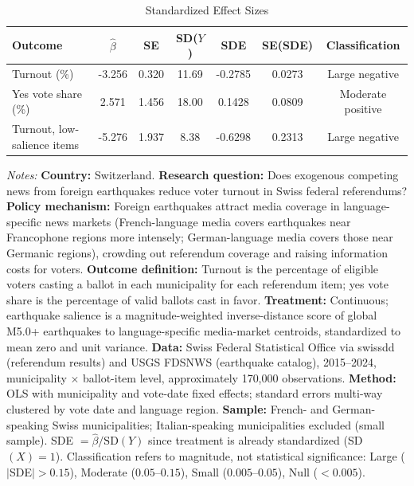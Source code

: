 \begin{table}[htbp]
\centering
\caption{Standardized Effect Sizes}
\label{tab:sde}
\begin{threeparttable}
\footnotesize
\begin{tabular}{lcccccc}
\toprule
Outcome & $\hat{\beta}$ & SE & SD($Y$) & SDE & SE(SDE) & Classification \\
\midrule
Turnout (\%) & -3.256 & 0.320 & 11.69 & -0.2785 & 0.0273 & Large negative \\
Yes vote share (\%) & 2.571 & 1.456 & 18.00 & 0.1428 & 0.0809 & Moderate positive \\
Turnout, low-salience items & -5.276 & 1.937 & 8.38 & -0.6298 & 0.2313 & Large negative \\
\bottomrule
\end{tabular}
\begin{tablenotes}[flushleft]
\footnotesize
\item \textit{Notes:} \textbf{Country:} Switzerland. \textbf{Research question:} Does exogenous competing news from foreign earthquakes reduce voter turnout in Swiss federal referendums? \textbf{Policy mechanism:} Foreign earthquakes attract media coverage in language-specific news markets (French-language media covers earthquakes near Francophone regions more intensely; German-language media covers those near Germanic regions), crowding out referendum coverage and raising information costs for voters. \textbf{Outcome definition:} Turnout is the percentage of eligible voters casting a ballot in each municipality for each referendum item; yes vote share is the percentage of valid ballots cast in favor. \textbf{Treatment:} Continuous; earthquake salience is a magnitude-weighted inverse-distance score of global M5.0+ earthquakes to language-specific media-market centroids, standardized to mean zero and unit variance. \textbf{Data:} Swiss Federal Statistical Office via swissdd (referendum results) and USGS FDSNWS (earthquake catalog), 2015--2024, municipality $\times$ ballot-item level, approximately 170,000 observations. \textbf{Method:} OLS with municipality and vote-date fixed effects; standard errors multi-way clustered by vote date and language region. \textbf{Sample:} French- and German-speaking Swiss municipalities; Italian-speaking municipalities excluded (small sample). SDE $= \hat{\beta} / \text{SD}(Y)$ since treatment is already standardized (SD$(X) = 1$). Classification refers to magnitude, not statistical significance: Large ($|$SDE$| > 0.15$), Moderate ($0.05$--$0.15$), Small ($0.005$--$0.05$), Null ($< 0.005$).
\end{tablenotes}
\end{threeparttable}
\end{table}

